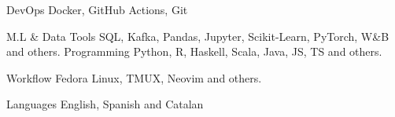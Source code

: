 

\begin{cvskills}

  \cvskill
    {DevOps} %
    {Docker, GitHub Actions, Git} %

  \cvskill
    {M.L \& Data Tools} %
    {SQL, Kafka, Pandas, Jupyter, Scikit-Learn, PyTorch, W\&B and others.} %
  \cvskill
    {Programming} %
    {Python, R, Haskell, Scala, Java, JS, TS and others. } %

  \cvskill
    {Workflow} %
    {Fedora Linux, TMUX, Neovim and others.} %

  \cvskill
    {Languages} %
    {English, Spanish and Catalan} %

\end{cvskills}
